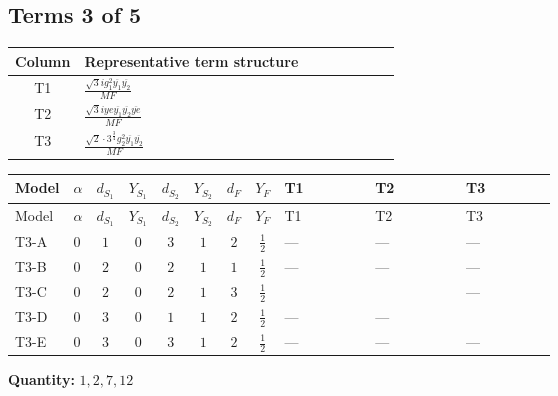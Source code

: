 \documentclass[8pt]{article}
\begin{document}
\begin{landscape}
\subsection*{Terms 3 of 5}
\begin{center}
\begin{tabular}{@{}c >{\raggedright\arraybackslash}p{0.82\linewidth}@{}}
\toprule
Column & Representative term structure \\
\midrule
T1 & \(\displaystyle \frac{\sqrt{3} i g_{1}^{2} \overline{y_{1}} \overline{y_{2}}}{MF}\) \\
\midrule
T2 & \(\displaystyle \frac{\sqrt{3} i ye \overline{y_{1}} \overline{y_{2}} \overline{ye}}{MF}\) \\
\midrule
T3 & \(\displaystyle \frac{\sqrt{2} \cdot 3^{\frac{3}{4}} g_{2}^{2} \overline{y_{1}} \overline{y_{2}}}{MF}\) \\
\midrule
\bottomrule
\end{tabular}
\end{center}
\smallskip
\tiny
\begin{longtable}{@{}llcccccc >{\raggedright\arraybackslash}p{0.21\linewidth} >{\raggedright\arraybackslash}p{0.21\linewidth} >{\raggedright\arraybackslash}p{0.21\linewidth}@{}}
\toprule
Model & $\alpha$ & $d_{S_1}$ & $Y_{S_1}$ & $d_{S_2}$ & $Y_{S_2}$ & $d_F$ & $Y_F$ & T1 & T2 & T3 \\
\midrule
\endfirsthead
\toprule
Model & $\alpha$ & $d_{S_1}$ & $Y_{S_1}$ & $d_{S_2}$ & $Y_{S_2}$ & $d_F$ & $Y_F$ & T1 & T2 & T3 \\
\midrule
\endhead
T3-A & $0$ & $1$ & $0$ & $3$ & $1$ & $2$ & $\frac{1}{2}$ & --- & --- & --- \\
\midrule
T3-B & $0$ & $2$ & $0$ & $2$ & $1$ & $1$ & $\frac{1}{2}$ & --- & --- & --- \\
\midrule
T3-C & $0$ & $2$ & $0$ & $2$ & $1$ & $3$ & $\frac{1}{2}$ & \scriptsize\adjustbox{max width=\linewidth}{$\begin{gathered} \frac{\sqrt{3} i g_{1}^{2} \overline{y_{1}} \overline{y_{2}}}{16 MF}\end{gathered}$} & \scriptsize\adjustbox{max width=\linewidth}{$\begin{gathered} - \frac{\sqrt{3} i ye \overline{y_{1}} \overline{y_{2}} \overline{ye}}{24 MF}\end{gathered}$} & --- \\
\midrule
T3-D & $0$ & $3$ & $0$ & $1$ & $1$ & $2$ & $\frac{1}{2}$ & --- & --- & \scriptsize\adjustbox{max width=\linewidth}{$\begin{gathered} - \frac{\sqrt{2} \cdot 3^{\frac{3}{4}} g_{2}^{2} \overline{y_{1}} \overline{y_{2}}}{6 MF}\end{gathered}$} \\
\midrule
T3-E & $0$ & $3$ & $0$ & $3$ & $1$ & $2$ & $\frac{1}{2}$ & --- & --- & --- \\
\midrule
\bottomrule
\end{longtable}
\clearpage
\noindent\textbf{Quantity: }$\mathrm{1,2,7,12}$\par\smallskip

\end{landscape}
\end{document}
